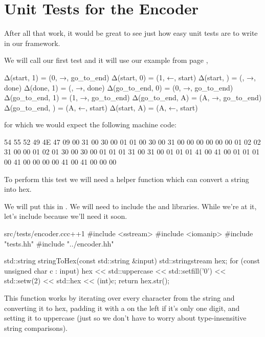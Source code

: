 \section {Unit Tests for the Encoder}

After all that work, it would be great to see just how easy unit tests are to write in our framework.

We will call our first test  and it will use our example from page \pageref{program:simpleTest},

\begin{stdout}
Δ(start, 1) = (0, →, go_to_end)
Δ(start, 0) = (1, ←, start)
Δ(start, ) = (, →, done)
Δ(done, 1) = (, →, done)
Δ(go_to_end, 0) = (0, →, go_to_end)
Δ(go_to_end, 1) = (1, →, go_to_end)
Δ(go_to_end, A) = (A, →, go_to_end)
Δ(go_to_end, ) = (A, ←, start)
Δ(start, A) = (A, ←, start)
\end{stdout}

for which we would expect the following machine code:

\begin{stdout}
54 55 52 49 4E 47 09 00 31 00 30 00 01 01 00 30 00 31 00 00 00 00 00 00 01 02 02 31 00 00 01 02 01 30 00 30 00 01 01 01 31 00 31 00 01 01 01 41 00 41 00 01 01 01 00 41 00 00 00 00 41 00 41 00 00 00
\end{stdout}

To perform this test we will need a helper function which can convert a string into hex.

We will put this in . We will need to include the  and  libraries. While we're at it, let's include  because we'll need it soon.

\begin{file}{src/tests/encoder.cc}{c++}{1}
#include <sstream>
#include <iomanip>
#include "tests.hh"
#include "../encoder.hh"

std::string stringToHex(const std::string &input)
{
    std::stringstream hex;
    for (const unsigned char c : input)
    {
        hex
            << std::uppercase
            << std::setfill('0')
            << std::setw(2)
            << std::hex << (int)c;
    }
    return hex.str();
}
\end{file}

This function works by iterating over every character from the string and converting it to hex, padding it with a  on the left if it's only one digit, and setting it to uppercase (just so we don't have to worry about type-insensitive string comparisons).

